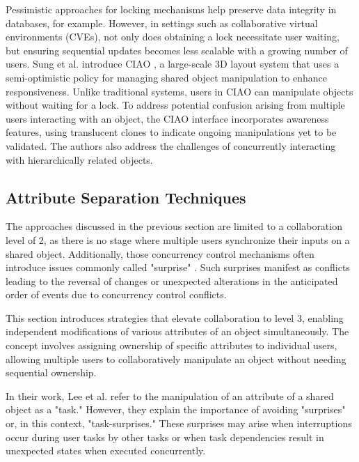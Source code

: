     Pessimistic approaches for locking mechanisms help preserve data integrity in databases, for example. However, in settings such as collaborative virtual environments (CVEs), not only does obtaining a lock necessitate user waiting, but ensuring sequential updates becomes less scalable with a growing number of users. Sung et al. introduce CIAO \cite{sungConcurrencyControlCIAO1999}, a large-scale 3D layout system that uses a semi-optimistic policy for managing shared object manipulation to enhance responsiveness. Unlike traditional systems, users in CIAO can manipulate objects without waiting for a lock. To address potential confusion arising from multiple users interacting with an object, the CIAO interface incorporates awareness features, using translucent clones to indicate ongoing manipulations yet to be validated. The authors also address the challenges of concurrently interacting with hierarchically related objects.
    
    \subsection{Attribute Separation Techniques} \label{sec:dof_concurrency}

    The approaches discussed in the previous section are limited to a collaboration level of 2, as there is no stage where multiple users synchronize their inputs on a shared object. Additionally, those concurrency control mechanisms often introduce issues commonly called "surprise" \cite{linebargerConcurrencyControlMechanisms2004}. Such surprises manifest as conflicts leading to the reversal of changes or unexpected alterations in the anticipated order of events due to concurrency control conflicts. 
    
    This section introduces strategies that elevate collaboration to level 3, enabling independent modifications of various attributes of an object simultaneously. The concept involves assigning ownership of specific attributes to individual users, allowing multiple users to collaboratively manipulate an object without needing sequential ownership.
    
    In their work, Lee et al. \cite{leeSupportingFineGrainedConcurrent2012} refer to the manipulation of an attribute of a shared object as a "task." However, they explain the importance of avoiding "surprises" or, in this context, "task-surprises." These surprises may arise when interruptions occur during user tasks by other tasks or when task dependencies result in unexpected states when executed concurrently.

